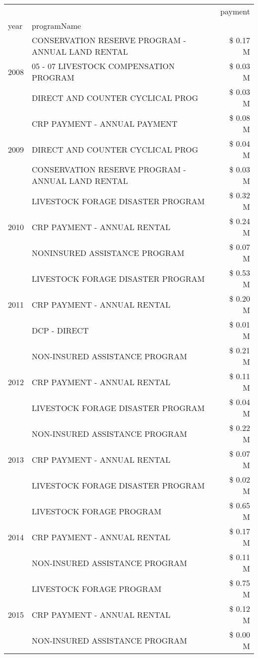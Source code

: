 \begin{tabular}{llr}
\toprule
 &  & payment \\
year & programName &  \\
\midrule
\multirow[t]{3}{*}{2008} & CONSERVATION RESERVE PROGRAM - ANNUAL LAND RENTAL & \$ 0.17 M \\
 & 05 - 07 LIVESTOCK COMPENSATION PROGRAM & \$ 0.03 M \\
 & DIRECT AND COUNTER CYCLICAL PROG & \$ 0.03 M \\
\cline{1-3}
\multirow[t]{3}{*}{2009} & CRP PAYMENT - ANNUAL PAYMENT & \$ 0.08 M \\
 & DIRECT AND COUNTER CYCLICAL PROG & \$ 0.04 M \\
 & CONSERVATION RESERVE PROGRAM - ANNUAL LAND RENTAL & \$ 0.03 M \\
\cline{1-3}
\multirow[t]{3}{*}{2010} & LIVESTOCK FORAGE DISASTER PROGRAM & \$ 0.32 M \\
 & CRP PAYMENT - ANNUAL RENTAL & \$ 0.24 M \\
 & NONINSURED ASSISTANCE PROGRAM & \$ 0.07 M \\
\cline{1-3}
\multirow[t]{3}{*}{2011} & LIVESTOCK FORAGE DISASTER PROGRAM & \$ 0.53 M \\
 & CRP PAYMENT - ANNUAL RENTAL & \$ 0.20 M \\
 & DCP - DIRECT & \$ 0.01 M \\
\cline{1-3}
\multirow[t]{3}{*}{2012} & NON-INSURED ASSISTANCE PROGRAM & \$ 0.21 M \\
 & CRP PAYMENT - ANNUAL RENTAL & \$ 0.11 M \\
 & LIVESTOCK FORAGE DISASTER PROGRAM & \$ 0.04 M \\
\cline{1-3}
\multirow[t]{3}{*}{2013} & NON-INSURED ASSISTANCE PROGRAM & \$ 0.22 M \\
 & CRP PAYMENT - ANNUAL RENTAL & \$ 0.07 M \\
 & LIVESTOCK FORAGE DISASTER PROGRAM & \$ 0.02 M \\
\cline{1-3}
\multirow[t]{3}{*}{2014} & LIVESTOCK FORAGE PROGRAM & \$ 0.65 M \\
 & CRP PAYMENT - ANNUAL RENTAL & \$ 0.17 M \\
 & NON-INSURED ASSISTANCE PROGRAM & \$ 0.11 M \\
\cline{1-3}
\multirow[t]{3}{*}{2015} & LIVESTOCK FORAGE PROGRAM & \$ 0.75 M \\
 & CRP PAYMENT - ANNUAL RENTAL & \$ 0.12 M \\
 & NON-INSURED ASSISTANCE PROGRAM & \$ 0.00 M \\

\end{tabular}
